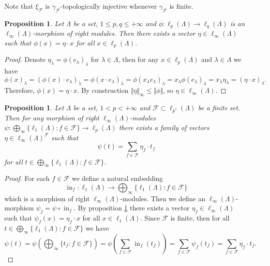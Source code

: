 \documentclass[12pt]{article}
\newtheorem{proposition}[theorem]{Proposition}
\begin{document}
Note that $\xi_{\mathcal{F}}$ is $\gamma_{\mathcal{F}}$-topologically injective
whenever $\gamma_{\mathcal{F}}$ is finite.

\begin{proposition}\label{LinfnMorphlpntolqnCharac}
    Let $\Lambda$ be a set, $1\leq p,q\leq +\infty$ 
    and $\phi:\ell_p(\Lambda)\to \ell_{q}(\Lambda)$ is 
    an $\ell_\infty(\Lambda)$-morphism of right modules. Then there exists a 
    vector $\eta\in\ell_\infty(\Lambda)$ such 
    that $\phi(x)=\eta\cdot x$ for all $x\in \ell_p(\Lambda)$.
\end{proposition}
\begin{proof}
    Denote $\eta_\lambda=\phi(e_\lambda)_\lambda$ for $\lambda\in\Lambda$, then 
    for any $x\in\ell_p(\Lambda)$ and $\lambda\in\Lambda$ we have
    \[
        \phi(x)_\lambda
        =(\phi(x)\cdot e_\lambda)_\lambda
        =\phi(x\cdot e_\lambda)_\lambda
        =\phi(x_\lambda e_\lambda)_\lambda
        =x_\lambda\phi(e_\lambda)_\lambda
        =x_\lambda\eta_\lambda
        =(\eta\cdot x)_\lambda.
    \]
    Therefore, $\phi(x)=\eta\cdot x$. By construction 
    $\Vert\eta\Vert_\infty\leq\Vert\phi\Vert$, so $\eta\in\ell_\infty(\Lambda)$.
\end{proof}

\begin{proposition}\label{ExtMorphSuml1ntlpnCharac}
    Let $\Lambda$ be a set, $1<p<+\infty$ 
    and $\mathcal{F}\subset \ell_{p^*}(\Lambda)$ be a finite set. Then for any 
    morphism of right $\ell_\infty(\Lambda)$-modules
    $\psi:\bigoplus_\infty\{\ell_1(\Lambda):f\in\mathcal{F}\}\to\ell_p(\Lambda)$ 
    there exists a family of vectors $\eta\in\ell_\infty(\Lambda)^\mathcal{F}$ 
    such that
    \[
        \psi(t)=\sum_{f\in\mathcal{F}} \eta_f \cdot t_f
    \]
    for all $t\in \bigoplus_\infty\{ \ell_1(\Lambda):f\in\mathcal{F}\}$.
\end{proposition}
\begin{proof}
    For each $f\in\mathcal{F}$  we define a natural embedding
    \[
        \operatorname{in}_f:
        \ell_1(\Lambda)\to\bigoplus_\infty\{\ell_1(\Lambda):f\in\mathcal{F}\}
    \]
    which is a morphism of right $\ell_\infty(\Lambda)$-modules. Then we define 
    an $\ell_\infty(\Lambda)$-morphism $\psi_f=\psi\circ \operatorname{in}_f$. 
    By proposition \ref{LinfnMorphlpntolqnCharac} there exists 
    a vector $\eta_f\in\ell_\infty(\Lambda)$ such that $\psi_f(x)=\eta_f\cdot x$ 
    for all $x\in\ell_1(\Lambda)$. Since $\mathcal{F}$ is finite, then for 
    all $t\in \bigoplus_\infty\{ \ell_1(\Lambda) : f\in \mathcal{F}\}$ we have
    \[
        \psi(t)
        =\psi\left(\bigoplus_\infty\{ t_f : f\in\mathcal{F}\}\right)
        =\psi\left(\sum_{f\in\mathcal{F}} \operatorname{in}_f(t_f)\right)
        =\sum_{f\in\mathcal{F}}\psi_f(t_f)
        =\sum_{f\in\mathcal{F}} \eta_f\cdot t_f.
    \]
\end{proof}
\end{document}
